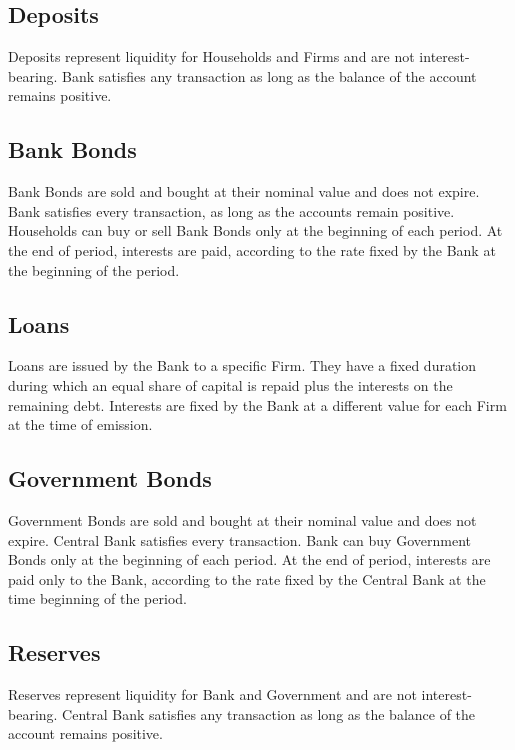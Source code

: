 \documentclass[a4paper, headings=standardclasses]{scrartcl}
\begin{document}
\subsection{Deposits}
Deposits represent liquidity for Households and Firms and are not interest-bearing. Bank satisfies any transaction as long as the balance of the account remains positive.

\subsection{Bank Bonds}
Bank Bonds are sold and bought at their nominal value and does not expire. Bank satisfies every transaction, as long as the accounts remain positive. Households can buy or sell Bank Bonds only at the beginning of each period. At the end of period, interests are paid, according to the rate fixed by the Bank at the beginning of the period.

\subsection{Loans}
Loans are issued by the Bank to a specific Firm. They have a fixed duration during which an equal share of capital is repaid plus the interests on the remaining debt. Interests are fixed by the Bank at a different value for each Firm at the time of emission.

\subsection{Government Bonds}
Government Bonds are sold and bought at their nominal value and does not expire. Central Bank satisfies every transaction. Bank can buy Government Bonds only at the beginning of each period. At the end of period, interests are paid only to the Bank, according to the rate fixed by the Central Bank at the time beginning of the period.

\subsection{Reserves}
Reserves represent liquidity for Bank and Government and are not interest-bearing. Central Bank satisfies any transaction as long as the balance of the account remains positive.
\end{document}
